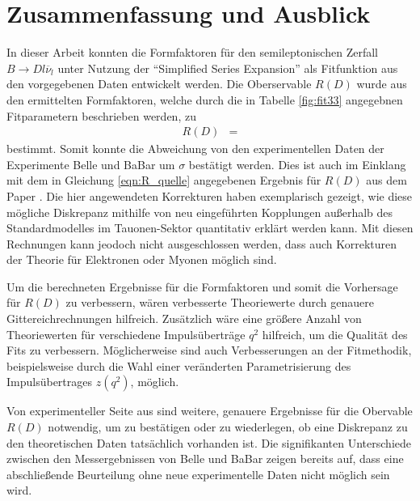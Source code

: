 \chapter{Zusammenfassung und Ausblick}

In dieser Arbeit konnten die Formfaktoren für den semileptonischen Zerfall $B \to D l \overline{\nu}_l$ unter Nutzung der \enquote{Simplified Series Expansion} als Fitfunktion aus den vorgegebenen Daten entwickelt werden.
Die Oberservable $R(D)$ wurde aus den ermittelten Formfaktoren, welche durch die in Tabelle \ref{fig:fit33} angegebnen Fitparametern beschrieben werden, zu
\begin{align*}
  R(D) &= 
\end{align*}
bestimmt.
Somit konnte die Abweichung von den experimentellen Daten der Experimente Belle und BaBar um $\sigma$ bestätigt werden.
Dies ist auch im Einklang mit dem in Gleichung \eqref{eqn:R_quelle} angegebenen Ergebnis für $R(D)$ aus dem Paper \cite{PhysRevD.92.034506}.
Die hier angewendeten Korrekturen haben exemplarisch gezeigt, wie diese mögliche Diskrepanz mithilfe von neu eingeführten Kopplungen außerhalb des Standardmodelles im Tauonen-Sektor quantitativ erklärt werden kann.
Mit diesen Rechnungen kann jeodoch nicht ausgeschlossen werden, dass auch Korrekturen der Theorie für Elektronen oder Myonen möglich sind.

Um die berechneten Ergebnisse für die Formfaktoren und somit die Vorhersage für $R(D)$ zu verbessern, wären verbesserte Theoriewerte durch genauere Gittereichrechnungen hilfreich.
Zusätzlich wäre eine größere Anzahl von Theoriewerten für verschiedene Impulsüberträge $q^2$ hilfreich, um die Qualität des Fits zu verbessern.
Möglicherweise sind auch Verbesserungen an der Fitmethodik, beispielsweise durch die Wahl einer veränderten Parametrisierung des Impulsübertrages $z(q^2)$, möglich.

Von experimenteller Seite aus sind weitere, genauere Ergebnisse für die Obervable $R(D)$ notwendig, um zu bestätigen oder zu wiederlegen, ob eine Diskrepanz zu den theoretischen Daten tatsächlich vorhanden ist.
Die signifikanten Unterschiede zwischen den Messergebnissen von Belle und BaBar zeigen bereits auf, dass eine abschließende Beurteilung ohne neue experimentelle Daten nicht möglich sein wird.
